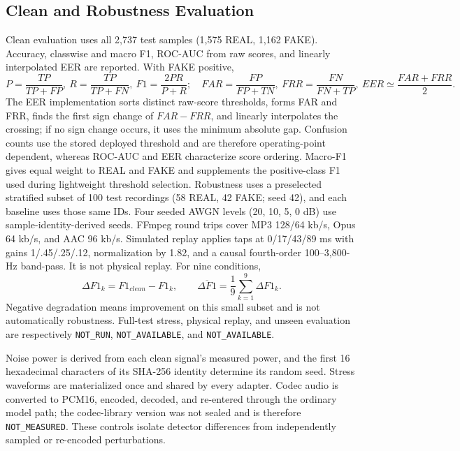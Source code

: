 \documentclass[10pt,journal,onecolumn,a4paper]{IEEEtran}
\begin{document}
\subsection{Clean and Robustness Evaluation}
Clean evaluation uses all 2,737 test samples (1,575 REAL, 1,162 FAKE). Accuracy, classwise and macro F1, ROC-AUC from raw scores, and linearly interpolated EER are reported. With FAKE positive,
\begin{equation}
P=\frac{TP}{TP+FP},\ R=\frac{TP}{TP+FN},\ F1=\frac{2PR}{P+R};\quad FAR=\frac{FP}{FP+TN},\ FRR=\frac{FN}{FN+TP},\ EER\simeq\frac{FAR+FRR}{2}.
\label{eq:metrics}
\end{equation}
The EER implementation sorts distinct raw-score thresholds, forms FAR and FRR, finds the first sign change of $FAR-FRR$, and linearly interpolates the crossing; if no sign change occurs, it uses the minimum absolute gap. Confusion counts use the stored deployed threshold and are therefore operating-point dependent, whereas ROC-AUC and EER characterize score ordering. Macro-F1 gives equal weight to REAL and FAKE and supplements the positive-class F1 used during lightweight threshold selection.
Robustness uses a preselected stratified subset of 100 test recordings (58 REAL, 42 FAKE; seed 42), and each baseline uses those same IDs. Four seeded AWGN levels (20, 10, 5, 0 dB) use sample-identity-derived seeds. FFmpeg round trips cover MP3 128/64 kb/s, Opus 64 kb/s, and AAC 96 kb/s. Simulated replay applies taps at 0/17/43/89 ms with gains 1/.45/.25/.12, normalization by 1.82, and a causal fourth-order 100--3,800-Hz band-pass. It is not physical replay. For nine conditions,
\begin{equation}
\Delta F1_k=F1_{clean}-F1_k,\qquad \overline{\Delta F1}=\frac{1}{9}\sum_{k=1}^{9}\Delta F1_k.
\label{eq:degradation}
\end{equation}
Negative degradation means improvement on this small subset and is not automatically robustness. Full-test stress, physical replay, and unseen evaluation are respectively \texttt{NOT\_RUN}, \texttt{NOT\_AVAILABLE}, and \texttt{NOT\_AVAILABLE}.

Noise power is derived from each clean signal's measured power, and the first 16 hexadecimal characters of its SHA-256 identity determine its random seed. Stress waveforms are materialized once and shared by every adapter. Codec audio is converted to PCM16, encoded, decoded, and re-entered through the ordinary model path; the codec-library version was not sealed and is therefore \texttt{NOT\_MEASURED}. These controls isolate detector differences from independently sampled or re-encoded perturbations.
\end{document}
